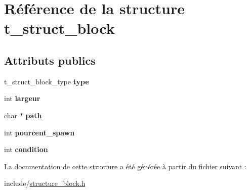 \hypertarget{structt__struct__block}{}\section{Référence de la structure t\+\_\+struct\+\_\+block}
\label{structt__struct__block}
\subsection*{Attributs publics}
\begin{DoxyCompactItemize}
\item 
\mbox{\label{structt__struct__block_a826dad197fbed343e772a46c4473d06c}} 
t\+\_\+struct\+\_\+block\+\_\+type {\bfseries type}
\item 
\mbox{\label{structt__struct__block_ae91ae09eaa8d10183e7d34fadd16ae97}} 
int {\bfseries largeur}
\item 
\mbox{\label{structt__struct__block_a3461e2a471be44cb9bbaf89ae65f9608}} 
char $\ast$ {\bfseries path}
\item 
\mbox{\label{structt__struct__block_ad9d4c680e1bbfb62bd37908a76fec04b}} 
int {\bfseries pourcent\+\_\+spawn}
\item 
\mbox{\label{structt__struct__block_a383f1b39ff96cdf157bd019b3e87a4a2}} 
int {\bfseries condition}
\end{DoxyCompactItemize}


La documentation de cette structure a été générée à partir du fichier suivant \+:\begin{DoxyCompactItemize}
\item 
include/\hyperlink{structure__block_8h}{structure\+\_\+block.\+h}\end{DoxyCompactItemize}
